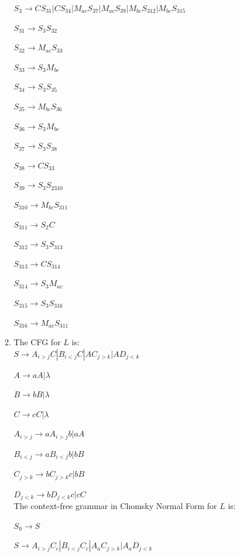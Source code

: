 \documentclass{article}%
\begin{document}
\begin{enumerate}
\begin{enumerate}
  
  $S_3 \rightarrow C S_{31} | C S_{34} | M_{ac}S_{37} | M_{ac}S_{39} | M_{bc}S_{312} | M_{bc}S_{315}$
	
	$S_{31} \rightarrow S_3S_{32}$
	
	$S_{32} \rightarrow M_{ac}S_{33}$
	
	$S_{33} \rightarrow S_3M_{bc}$
	
	$S_{34} \rightarrow S_3S_{35}$
	
	$S_{35} \rightarrow M_{bc}S_{36}$
	
	$S_{36} \rightarrow S_3M_{bc}$
	
	$S_{37} \rightarrow S_3S_{38}$
	
	$S_{38} \rightarrow CS_{33}$
	
	$S_{39} \rightarrow S_3S_{2310}$
	
	$S_{310} \rightarrow M_{bc}S_{311}$
	
	$S_{311} \rightarrow S_2C$
	
	$S_{312} \rightarrow S_3S_{313}$
	
	$S_{313} \rightarrow CS_{314}$
	
	$S_{314} \rightarrow S_3M_{ac}$
	
    $S_{315} \rightarrow S_3S_{316}$
    
    $S_{316} \rightarrow M_{ac}S_{311}$
	
	\item The CFG for $L$ is: \\
	
	$S \rightarrow A_{i>j}C | B_{i<j}C | AC_{j>k}|AD_{j<k}$
	
	$A \rightarrow aA | \lambda$
	
	$B \rightarrow bB | \lambda$
	
	$C \rightarrow cC | \lambda$
	

	
	$A_{i>j} \rightarrow aA_{i>j}b | aA$
	
	$B_{i<j} \rightarrow aB_{i<j}b | bB$
	
	$C_{j>k} \rightarrow bC_{j>k}c | bB$
	
	$D_{j<k} \rightarrow bD_{j<k}c | cC$\\
	
  The context-free grammar in Chomsky Normal Form for $L$ is:
	
	$S_0 \rightarrow S$ 
	
	$S \rightarrow A_{i>j}C_c | B_{i<j}C_c | A_aC_{j>k}|A_aD_{j<k}$
	

\end{enumerate}
\end{enumerate}
\end{document}
